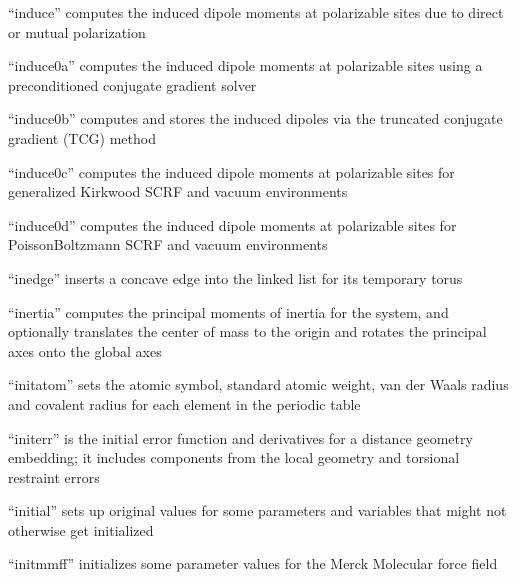 \documentclass[letterpaper,11pt,english]{sphinxmanual}
\begin{document}
“induce” computes the induced dipole moments at polarizable
sites due to direct or mutual polarization


“induce0a” computes the induced dipole moments at polarizable
sites using a preconditioned conjugate gradient solver


“induce0b” computes and stores the induced dipoles via
the truncated conjugate gradient (TCG) method


“induce0c” computes the induced dipole moments at polarizable
sites for generalized Kirkwood SCRF and vacuum environments


“induce0d” computes the induced dipole moments at polarizable
sites for Poisson\sphinxhyphen{}Boltzmann SCRF and vacuum environments


“inedge” inserts a concave edge into the
linked list for its temporary torus


“inertia” computes the principal moments of inertia for the
system, and optionally translates the center of mass to the
origin and rotates the principal axes onto the global axes


“initatom” sets the atomic symbol, standard atomic weight,
van der Waals radius and covalent radius for each element in
the periodic table


“initerr” is the initial error function and derivatives for
a distance geometry embedding; it includes components from
the local geometry and torsional restraint errors


“initial” sets up original values for some parameters and
variables that might not otherwise get initialized


“initmmff” initializes some parameter values for the Merck
Molecular force field

\end{document}
